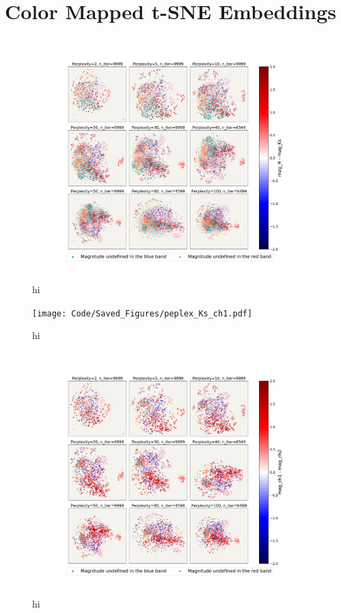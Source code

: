 \newpage
\section{Color Mapped t-SNE Embeddings}

\begin{figure}[h!]
    \centering
    \includegraphics[trim={5cm 3cm 5cm 3cm},clip,width=\textwidth]{Code/Saved_Figures/peplex_H_Ks.pdf}
    \caption{hi}
    \label{embeddding_H_ks}
\end{figure}

\begin{figure}[h!]
    \centering
    \texttt{[image: Code/Saved\_Figures/peplex\_Ks\_ch1.pdf]}
    \caption{hi}
    \label{embeddding_ks_ch1}
\end{figure}

\begin{figure}[h!]
    \centering
    \includegraphics[trim={5cm 3cm 5cm 3cm},clip,width=\textwidth]{Code/Saved_Figures/peplex_ch1_ch2.pdf}
    \caption{hi}
    \label{embeddding_ch1_ch2}
\end{figure}